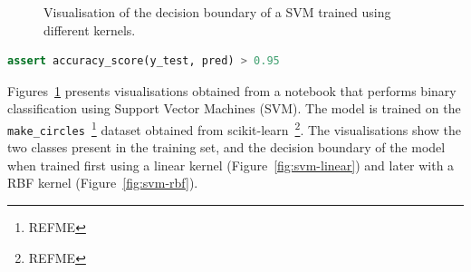 \documentclass[acmsmall,screen,review,anonymous]{acmart}
\begin{document}




\begin{figure}
  \hfill
  \caption{Visualisation of the decision boundary of a SVM trained using different kernels.}
  \label{fig:svm}
\end{figure}
\begin{lstlisting}[language=Python]
assert accuracy_score(y_test, pred) > 0.95
\end{lstlisting}
\label{lst:svm}

Figures~\ref{fig:svm} presents visualisations obtained from a notebook that performs binary classification using Support Vector Machines (SVM). The model is trained on the \texttt{make\_circles}~\footnote{REFME} dataset obtained from scikit-learn~\footnote{REFME}. The visualisations show the two classes present in the training set, and the decision boundary of the model when trained first using a linear kernel (Figure~\ref{fig:svm-linear}) and later with a RBF kernel (Figure~\ref{fig:svm-rbf}).
\end{document}
